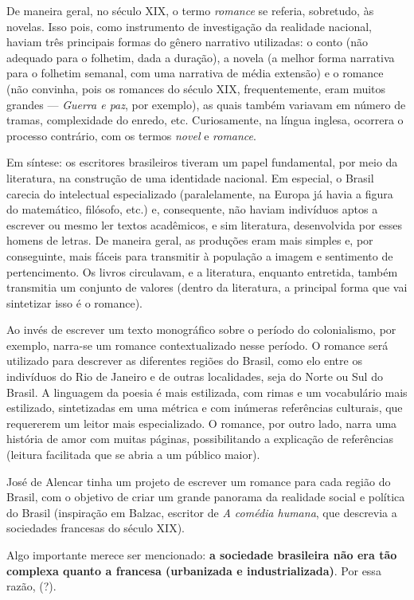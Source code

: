 De maneira geral, no século XIX, o termo \textit{romance} se referia, sobretudo, às novelas. Isso pois, como instrumento de investigação da realidade nacional, haviam três principais formas do gênero narrativo utilizadas: o conto (não adequado para o folhetim, dada a duração), a novela (a melhor forma narrativa para o folhetim semanal, com uma narrativa de média extensão) e o romance (não convinha, pois os romances do século XIX, frequentemente, eram muitos grandes — \textit{Guerra e paz}, por exemplo), as quais também variavam em número de tramas, complexidade do enredo, etc. Curiosamente, na língua inglesa, ocorrera o processo contrário, com os termos \textit{novel} e \textit{romance}.

Em síntese: os escritores brasileiros tiveram um papel fundamental, por meio da literatura, na construção de uma identidade nacional. Em especial, o Brasil carecia do intelectual especializado (paralelamente, na Europa já havia a figura do matemático, filósofo, etc.) e, consequente, não haviam indivíduos aptos a escrever ou mesmo ler textos acadêmicos, e sim literatura, desenvolvida por esses homens de letras. De maneira geral, as produções eram mais simples e, por conseguinte, mais fáceis para transmitir à população a imagem e sentimento de pertencimento. Os livros circulavam, e a literatura, enquanto entretida, também transmitia um conjunto de valores (dentro da literatura, a principal forma que vai sintetizar isso é o romance).

Ao invés de escrever um texto monográfico sobre o período do colonialismo, por exemplo, narra-se um romance contextualizado nesse período. O romance será utilizado para descrever as diferentes regiões do Brasil, como elo entre os indivíduos do Rio de Janeiro e de outras localidades, seja do Norte ou Sul do Brasil. A linguagem da poesia é mais estilizada, com rimas e um vocabulário mais estilizado, sintetizadas em uma métrica e com inúmeras referências culturais, que requererem um leitor mais especializado. O romance, por outro lado, narra uma história de amor com muitas páginas, possibilitando a explicação de referências (leitura facilitada que se abria a um público maior).

José de Alencar tinha um projeto de escrever um romance para cada região do Brasil, com o objetivo de criar um grande panorama da realidade social e política do Brasil (inspiração em Balzac, escritor de \textit{A comédia humana}, que descrevia a sociedades francesas do século XIX).

Algo importante merece ser mencionado: \textbf{a sociedade brasileira não era tão complexa quanto a francesa (urbanizada e industrializada)}. Por essa razão, (?).

